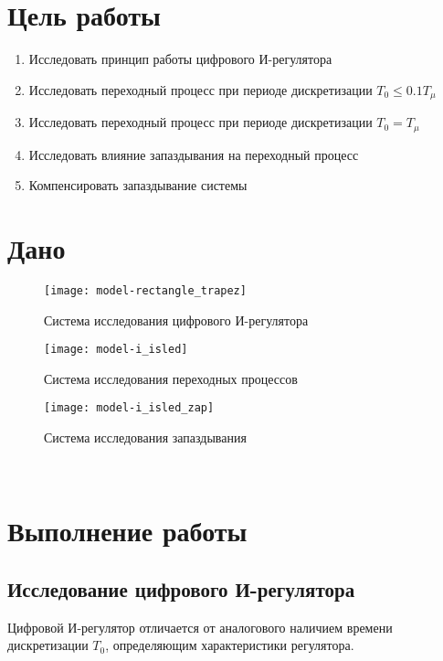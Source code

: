 


    


    \section{Цель работы}
    \begin{enumerate}
        \item Исследовать принцип работы цифрового И-регулятора
        \item Исследовать переходный процесс при периоде дискретизации $T_0\leq0.1T_\mu$
        \item Исследовать переходный процесс при периоде дискретизации $T_0=T_\mu$
        \item Исследовать влияние запаздывания на переходный процесс
        \item Компенсировать запаздывание системы
    \end{enumerate}


    \section{Дано}
    \begin{figure}[H]
        \centering\texttt{[image: model-rectangle\_trapez]}
        \caption{Система исследования цифрового И-регулятора}
    \end{figure}
    \begin{figure}[H]
        \centering\texttt{[image: model-i\_isled]}
        \caption{Система исследования переходных процессов}
    \end{figure}
    \begin{figure}[H]
        \centering\texttt{[image: model-i\_isled\_zap]}
        \caption{Система исследования запаздывания}
    \end{figure}

    \begin{center}
        \noindent{}\\
    \end{center}


    \section{Выполнение работы}

    \subsection{Исследование цифрового И-регулятора}
    Цифровой И-регулятор отличается от аналогового наличием времени дискретизации $T_0$,
    определяющим характеристики регулятора.


